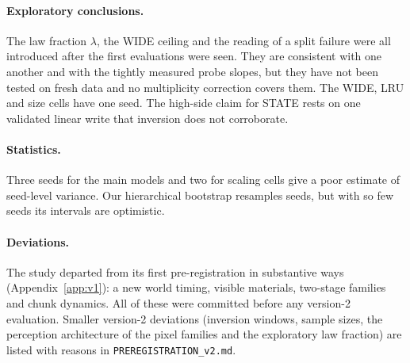 \paragraph{Exploratory conclusions.} The law fraction $\lambda$, the WIDE ceiling and the reading
of a split failure were all introduced after the first evaluations were seen. They are consistent
with one another and with the tightly measured probe slopes, but they have not been tested on fresh
data and no multiplicity correction covers them. The WIDE, LRU and size cells have one seed. The
high-side claim for STATE rests on one validated linear write that inversion does not corroborate.

\paragraph{Statistics.} Three seeds for the main models and two for scaling cells give a poor
estimate of seed-level variance. Our hierarchical bootstrap resamples seeds, but with so few seeds
its intervals are optimistic.

\paragraph{Deviations.} The study departed from its first pre-registration in substantive ways
(Appendix~\ref{app:v1}): a new world timing, visible materials, two-stage families and chunk
dynamics. All of these were committed before any version-2 evaluation. Smaller version-2 deviations
(inversion windows, sample sizes, the perception architecture of the pixel families and the
exploratory law fraction) are listed with reasons in \texttt{PREREGISTRATION\_v2.md}.
